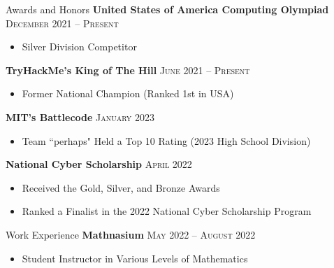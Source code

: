 \begin{resume_section}{Awards and Honors}
	\textbf{United States of America Computing Olympiad} \hspace*{\fill} \textsc{December 2021 -- Present} \\

	\vspace*{-0.25in}

	\begin{itemize}
		\setlength{\labelsep}{0.1in}
		\item Silver Division Competitor
	\end{itemize}

	\textbf{TryHackMe's King of The Hill} \hspace*{\fill} \textsc{June 2021 -- Present} \\

	\vspace*{-0.25in}

	\begin{itemize}
		\setlength{\labelsep}{0.1in}
		\item Former National Champion (Ranked 1st in USA)
	\end{itemize}

	\textbf{MIT's Battlecode} \hspace*{\fill} \textsc{January 2023} \\

	\vspace*{-0.25in}

	\begin{itemize}
		\setlength{\labelsep}{0.1in}
		\item Team ``perhaps" Held a Top 10 Rating (2023 High School Division)
	\end{itemize}

	\textbf{National Cyber Scholarship} \hspace*{\fill} \textsc{April 2022} \\

	\vspace*{-0.25in}

	\begin{itemize}
		\setlength{\labelsep}{0.1in}
		\item Received the Gold, Silver, and Bronze Awards
		\item Ranked a Finalist in the 2022 National Cyber Scholarship Program
	\end{itemize}
\end{resume_section}

\bigskip

\begin{resume_section}{Work Experience}
	\textbf{Mathnasium} \hspace*{\fill} \textsc{May 2022 -- August 2022} \\

	\vspace*{-0.25in}

	\begin{itemize}
		\setlength{\labelsep}{0.1in}
		\item Student Instructor in Various Levels of Mathematics
	\end{itemize}
\end{resume_section}